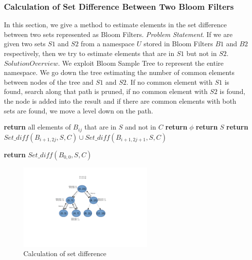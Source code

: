 \documentclass[a4paper]{article}
\begin{document}
\subsubsection{Calculation of Set Difference Between Two Bloom Filters}
In this section, we give a method to estimate elements in the set difference between two sets represented as Bloom Filters. \newline
\textit{Problem Statement}. If we are given two sets $S1$ and $S2$ from a namespace $U$ stored in Bloom Filters $B1$ and $B2$ respectively, then we try to estimate elements that are in $S1$ but not in $S2$. \newline
$Solution Overview.$ We exploit Bloom Sample Tree \cite{sengupta:2017} to represent the entire namespace. We go down the tree estimating the number of common elements between nodes of the tree and $S1$ and $S2$. If no common element with $S1$ is found, search along that path is pruned, if no common element with $S2$ is found, the node is added into the result and if there are common elements with both sets are found, we move a level down on the path.


\begin{algorithm}
\caption{$Set\_diff (B_{ij}, S, C)$}
\begin{algorithmic}[1]
    \State \textbf{return} all elements of $B_{ij}$ that are in $S$ and not in $C$
    \State  \textbf{return} $\phi$
    \State  \textbf{return} $S$
    \Else 
    \State
    \textbf{return} $Set\_diff (B_{i+1,2j}, S, C) \cup Set\_diff (B_{i+1,2j+1}, S, C)$
  \EndIf
\EndProcedure
\end{algorithmic}
\end{algorithm}
\begin{algorithm}
\caption{$Set\_difference (B_{ij}, S, C)$}
\begin{algorithmic}[1]
 \State 
 \textbf{return} $Set\_diff (B_{0,0}, S, C)$
\EndProcedure
\end{algorithmic}
\end{algorithm}




\begin{figure}[h!] 
\centering
\includegraphics[width=0.6\textwidth]{sd.png}
\caption{\label{fig:Set Difference}Calculation of set difference}
\end{figure}
\end{document}

